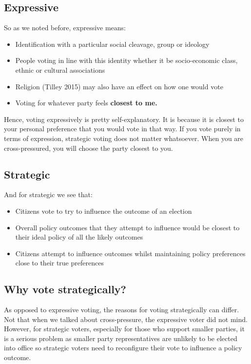 \documentclass[12pt, letterpaper]{article}
\begin{document}
\subsection{Expressive}
So as we noted before, expressive means:
\begin{itemize}
	\item Identification with a particular social cleavage, group or ideology
	\item People voting in line with this identity whether it be socio-economic class, ethnic or cultural associations
	\item Religion (Tilley 2015) may also have an effect on how one would vote
	\item Voting for whatever party feels \textbf{closest to me.}
\end{itemize}

Hence, voting expressively is pretty self-explanatory. It is because it is closest to your personal preference that you would vote in that way. If you vote purely in terms of expression, strategic voting does not matter whatsoever. When you are cross-pressured, you will choose the party closest to you.

\subsection{Strategic}
And for strategic we see that:
\begin{itemize}
	\item Citizens vote to try to influence the outcome of an election
	\item Overall policy outcomes that they attempt to influence would be closest to their ideal policy of all the likely outcomes
	\item Citizens attempt to influence outcomes whilst maintaining policy preferences close to their true preferences
\end{itemize}

\subsection{Why vote strategically?}
As opposed to expressive voting, the reasons for voting strategically can differ. Not that when we talked about cross-pressure, the expressive voter did not mind. However, for strategic voters, especially for those who support smaller parties, it is a serious problem as smaller party representatives are unlikely to be elected into office so strategic voters need to reconfigure their vote to influence a policy outcome.
\end{document}
